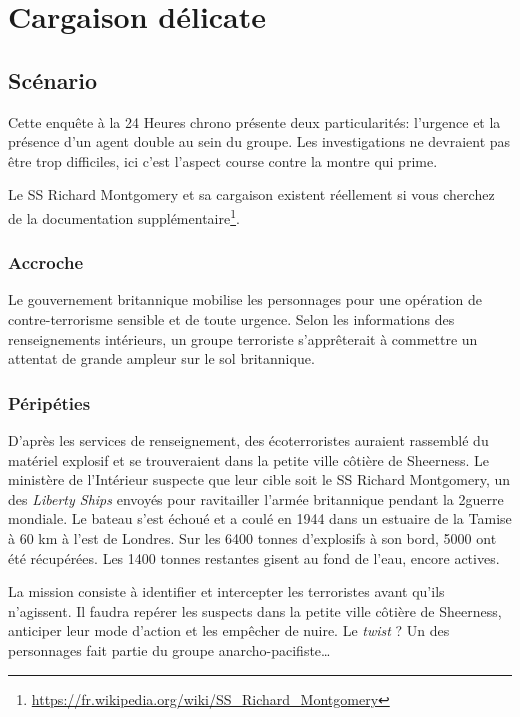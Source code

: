 \chapter{Cargaison délicate}

\section{Scénario}

Cette enquête à la 24 Heures chrono présente deux particularités: l'urgence et la présence d'un agent double au sein du groupe.
Les investigations ne devraient pas être trop difficiles, ici c'est l'aspect \og course contre la montre \fg qui prime.

Le SS Richard Montgomery et sa cargaison existent réellement si vous cherchez de la documentation supplémentaire\footnote{\url{https://fr.wikipedia.org/wiki/SS_Richard_Montgomery}}.

\subsection{Accroche}

Le gouvernement britannique mobilise les personnages pour une opération de contre-terrorisme sensible et de toute urgence.
Selon les informations des renseignements intérieurs, un groupe terroriste s'apprêterait à commettre un attentat de grande ampleur sur le sol britannique.

\subsection{Péripéties}

D'après les services de renseignement, des écoterroristes auraient rassemblé du matériel explosif et se trouveraient dans la petite ville côtière de Sheerness.
Le ministère de l'Intérieur suspecte que leur cible soit le SS Richard Montgomery, un des \emph{Liberty Ships}  envoyés pour ravitailler l'armée britannique pendant la 2\ieme guerre mondiale.
Le bateau s'est échoué et a coulé en 1944 dans un estuaire de la Tamise à 60 km à l'est de Londres.
Sur les 6400 tonnes d'explosifs à son bord, 5000 ont été récupérées.
Les 1400 tonnes restantes gisent au fond de l'eau, encore actives.

La mission consiste à identifier et intercepter les terroristes avant qu'ils n'agissent. Il faudra repérer les suspects dans la petite ville côtière de Sheerness, anticiper leur mode d'action et les empêcher de nuire. Le \emph{twist} ? Un des personnages fait partie du groupe anarcho-pacifiste\dots

